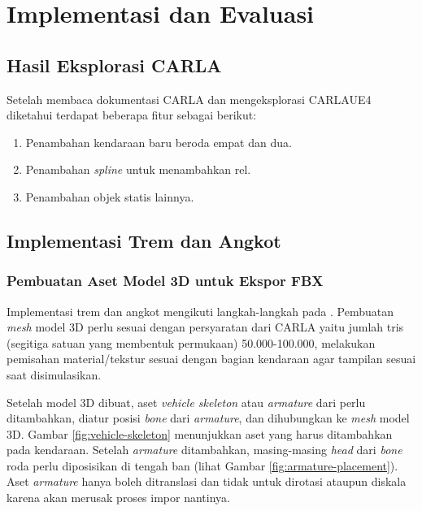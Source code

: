 \chapter{Implementasi dan Evaluasi}


\section{Hasil Eksplorasi CARLA}

Setelah membaca dokumentasi CARLA dan mengeksplorasi CARLAUE4 diketahui terdapat
beberapa fitur sebagai berikut:

\begin{enumerate}
	\item Penambahan kendaraan baru beroda empat dan dua.
	\item Penambahan \textit{spline} untuk menambahkan rel.
	\item Penambahan objek statis lainnya.
\end{enumerate}



\section{Implementasi Trem dan Angkot}

\subsection{Pembuatan Aset Model 3D untuk Ekspor FBX}

Implementasi trem dan angkot mengikuti langkah-langkah pada
\cite{blender-add-a-new-vehicle}. Pembuatan \textit{mesh} model 3D perlu sesuai
dengan persyaratan dari CARLA yaitu jumlah tris (segitiga satuan yang membentuk
permukaan) 50.000-100.000, melakukan pemisahan material/tekstur sesuai dengan
bagian kendaraan agar tampilan sesuai saat disimulasikan.

Setelah model 3D dibuat, aset \textit{vehicle skeleton} atau \textit{armature}
dari \cite{blender-add-a-new-vehicle} perlu ditambahkan, diatur posisi
\textit{bone} dari \textit{armature}, dan dihubungkan ke \textit{mesh} model 3D.
Gambar \ref{fig:vehicle-skeleton} menunjukkan aset yang harus ditambahkan pada
kendaraan. Setelah \textit{armature} ditambahkan, masing-masing \textit{head}
dari \textit{bone} roda perlu diposisikan di tengah ban (lihat Gambar
\ref{fig:armature-placement}). Aset \textit{armature} hanya boleh ditranslasi
dan tidak untuk dirotasi ataupun diskala karena akan merusak proses impor
nantinya.

